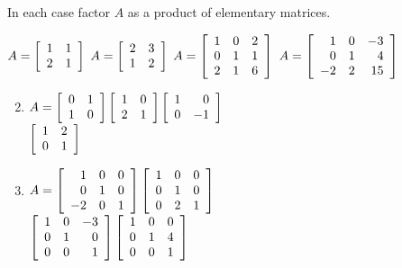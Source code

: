 \begin{multicols}{2}
\columnbreak
\begin{ex}
In each case factor $A$ as a product of elementary matrices.
\begin{exenumerate}
\exitem $A = \left[ \begin{array}{rr}
1 & 1 \\
2 & 1
\end{array} \right]$
\exitem $A = \left[ \begin{array}{rr}
2 & 3 \\
1 & 2
\end{array} \right]$
\exitem $A = \left[ \begin{array}{rrr}
1 & 0 & 2 \\
0 & 1 & 1 \\
2 & 1 & 6
\end{array} \right]$
\exitem $A = \left[ \begin{array}{rrr}
1 & 0 & -3 \\
0 & 1 & 4 \\
-2 & 2 & 15
\end{array} \right]$
\end{exenumerate}
\begin{sol}
\begin{enumerate}[label={\alph*.}]
\setcounter{enumi}{1}
\item $A = \left[ \begin{array}{rr}
0 & 1 \\
1 & 0
\end{array} \right] \left[ \begin{array}{rr}
1 & 0 \\
2 & 1
\end{array} \right] \left[ \begin{array}{rr}
1 & 0 \\
0 & -1
\end{array} \right]$ \\ $\left[ \begin{array}{rr}
1 & 2 \\
0 & 1
\end{array} \right]$

\setcounter{enumi}{3}
\item $A = \left[ \begin{array}{rrr}
1 & 0 & 0 \\
0 & 1 & 0 \\
-2 & 0 & 1
\end{array} \right] \left[ \begin{array}{rrr}
1 & 0 & 0 \\
0 & 1 & 0 \\
0 & 2 & 1
\end{array} \right]$ \\ $\left[ \begin{array}{rrr}
1 & 0 & -3 \\
0 & 1 & 0 \\
0 & 0 & 1
\end{array} \right] \left[ \begin{array}{rrr}
1 & 0 & 0 \\
0 & 1 & 4 \\
0 & 0 & 1
\end{array} \right]$


\end{enumerate}
\end{sol}
\end{ex}
\end{multicols}
